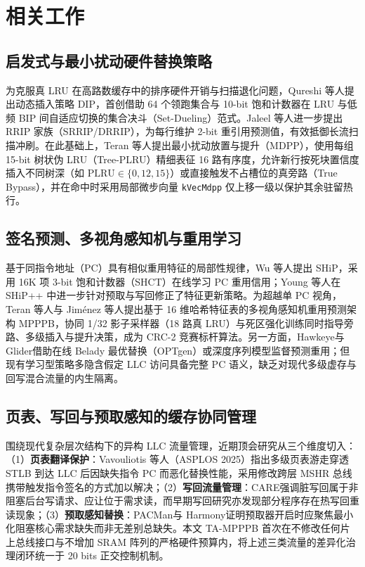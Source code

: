 \documentclass[10.5pt,compsoc,UTF8]{CjC}
\newcommand{\upcite}[1]{\cite{#1}}
\begin{document}
\section{相关工作}

\subsection{启发式与最小扰动硬件替换策略}

为克服真 LRU 在高路数缓存中的排序硬件开销与扫描退化问题，Qureshi 等人\upcite{qureshi2007dip}提出动态插入策略 DIP，首创借助 64 个领跑集合与 10-bit 饱和计数器在 LRU 与低频 BIP 间自适应切换的集合决斗（Set-Dueling）范式。Jaleel 等人\upcite{jaleel2010rrip}进一步提出 RRIP 家族（SRRIP/DRRIP），为每行维护 2-bit 重引用预测值，有效抵御长流扫描冲刷。在此基础上，Teran 等人\upcite{teran2016mdpp}提出最小扰动放置与提升（MDPP），使用每组 15-bit 树状伪 LRU（Tree-PLRU）精细表征 16 路有序度，允许新行按死块置信度插入不同树深（如 $\mathrm{PLRU}\in\{0,12,15\}$）或直接触发不占槽位的真旁路（True Bypass），并在命中时采用局部微步向量 \texttt{kVecMdpp} 仅上移一级以保护其余驻留热行。

\subsection{签名预测、多视角感知机与重用学习}

基于同指令地址（PC）具有相似重用特征的局部性规律，Wu 等人\upcite{wu2011ship}提出 SHiP，采用 16K 项 3-bit 饱和计数器（SHCT）在线学习 PC 重用信用；Young 等人\upcite{young2017shippp}在 SHiP++ 中进一步针对预取与写回修正了特征更新策略。为超越单 PC 视角，Teran 等人\upcite{teran2016perceptron}与 Jiménez 等人\upcite{jimenez2017mpppb}提出基于 16 维哈希特征表的多视角感知机重用预测架构 MPPPB，协同 1/32 影子采样器（18 路真 LRU）与死区强化训练同时指导旁路、多级插入与提升决策，成为 CRC-2 竞赛标杆算法\upcite{jimenez2017crc2}。另一方面，Hawkeye\upcite{jain2016hawkeye}与 Glider\upcite{shi2019glider}借助在线 Belady 最优替换（OPTgen）或深度序列模型监督预测重用；但现有学习型策略多隐含假定 LLC 访问具备完整 PC 语义，缺乏对现代多级虚存与回写混合流量的内生隔离。

\subsection{页表、写回与预取感知的缓存协同管理}

围绕现代复杂层次结构下的异构 LLC 流量管理，近期顶会研究从三个维度切入：（1）\textbf{页表翻译保护}：Vavouliotis 等人\upcite{vavouliotis2025translation}（ASPLOS 2025）指出多级页表游走穿透 STLB 到达 LLC 后因缺失指令 PC 而恶化替换性能，采用修改跨层 MSHR 总线携带触发指令签名的方式加以解决；（2）\textbf{写回流量管理}：CARE\upcite{lu2023care}强调脏写回属于非阻塞后台写请求、应让位于需求读，而早期写回研究亦发现部分程序存在热写回重读现象；（3）\textbf{预取感知替换}：PACMan\upcite{wu2011pacman}与 Harmony\upcite{jain2018harmony}证明预取器开启时应聚焦最小化阻塞核心需求缺失而非无差别总缺失。本文 TA-MPPPB 首次在不修改任何片上总线接口与不增加 SRAM 阵列的严格硬件预算内，将上述三类流量的差异化治理闭环统一于 20 bits 正交控制机制。
\end{document}
